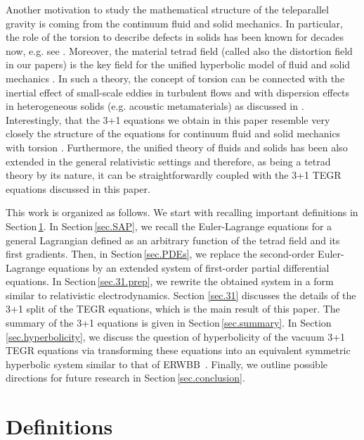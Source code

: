 \documentclass[
10pt, %
a4paper, %
oneside, %
twocolumn,
headinclude,footinclude, %
BCOR5mm, %
]{scrartcl}
\newcommand{\ERWBB}{{ERWBB}}
\begin{document}
	
	Another motivation to study the mathematical structure of
	the teleparallel gravity is coming from the continuum fluid and solid
	mechanics. In particular, the role of the torsion to describe defects in
	solids has been known for decades now, e.g. see
	\cite{VolovichKatanaev1992,Hehl2007,Yavari2012,NguyenLeMarrec2022,Bohmer2020,Lychev2022}.
	Moreover, the material tetrad field (called also the distortion field in our
	papers) is the key field for the unified hyperbolic model of fluid and solid
	mechanics \cite{HPR2016,DPRZ2016}. In such a theory, the concept of torsion
	can be connected with the inertial effect of small-scale eddies in turbulent
	flows and with dispersion effects in heterogeneous solids (e.g. acoustic
	metamaterials) as discussed in \cite{Torsion2019}. Interestingly, that the
	3+1 equations we obtain in this paper resemble very closely the structure
	of the equations for continuum fluid and solid mechanics with torsion
	\cite{Torsion2019}. Furthermore, the unified theory of fluids and solids has
	been also extended in the general relativistic settings \cite{PTRSA2020} and
	therefore, as being a tetrad theory by its nature, it can be
	straightforwardly coupled with the 3+1 TEGR equations discussed in this
	paper.

	This work is organized as follows. We start with recalling important
	definitions in Section\,\ref{sec.def}. In Section\,\ref{sec.SAP}, we recall
	the Euler-Lagrange equations for a general Lagrangian defined as an
	arbitrary function of the tetrad field and its first gradients. Then, in
	Section\,\ref{sec.PDEs}, we replace the second-order Euler-Lagrange
	equations by an extended system of first-order partial differential
	equations. In Section\,\ref{sec.31.prep}, we rewrite the obtained system in
	a form similar to relativistic electrodynamics. Section \ref{sec.31}
	discusses the details of the 3+1 split of the TEGR equations, which is the
	main result of this paper. The summary of the 3+1 equations is given in
	Section\,\ref{sec.summary}. In Section\,\ref{sec.hyperbolicity}, we discuss
	the question of hyperbolicity of the vacuum 3+1 TEGR equations via
	transforming these equations into an equivalent symmetric hyperbolic system similar to that of \ERWBB\ \cite{Estabrook1997,Buchman2003}. Finally, we
	outline possible directions for future research in
	Section\,\ref{sec.conclusion}.

	\section{Definitions}\label{sec.def}
	
\end{document}
